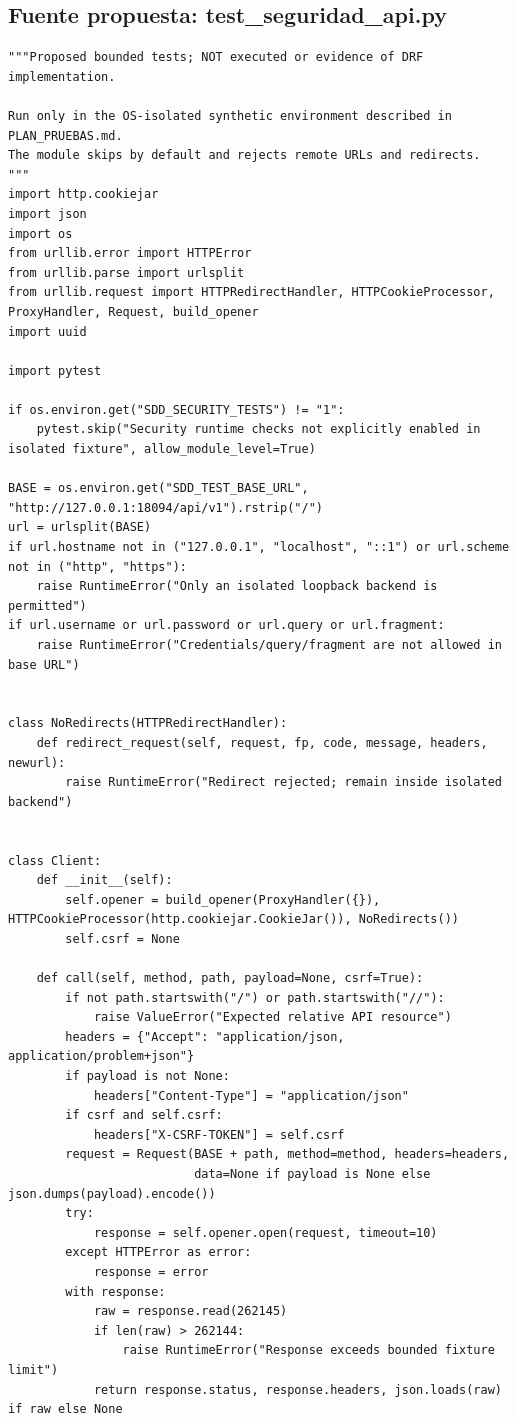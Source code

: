\documentclass[11pt,a4paper]{article}
\begin{document}
\subsection{Fuente propuesta: test\_seguridad\_api.py}
\begin{Verbatim}[breaklines=true,breakanywhere=true,fontsize=\footnotesize]
"""Proposed bounded tests; NOT executed or evidence of DRF implementation.

Run only in the OS-isolated synthetic environment described in PLAN_PRUEBAS.md.
The module skips by default and rejects remote URLs and redirects.
"""
import http.cookiejar
import json
import os
from urllib.error import HTTPError
from urllib.parse import urlsplit
from urllib.request import HTTPRedirectHandler, HTTPCookieProcessor, ProxyHandler, Request, build_opener
import uuid

import pytest

if os.environ.get("SDD_SECURITY_TESTS") != "1":
    pytest.skip("Security runtime checks not explicitly enabled in isolated fixture", allow_module_level=True)

BASE = os.environ.get("SDD_TEST_BASE_URL", "http://127.0.0.1:18094/api/v1").rstrip("/")
url = urlsplit(BASE)
if url.hostname not in ("127.0.0.1", "localhost", "::1") or url.scheme not in ("http", "https"):
    raise RuntimeError("Only an isolated loopback backend is permitted")
if url.username or url.password or url.query or url.fragment:
    raise RuntimeError("Credentials/query/fragment are not allowed in base URL")


class NoRedirects(HTTPRedirectHandler):
    def redirect_request(self, request, fp, code, message, headers, newurl):
        raise RuntimeError("Redirect rejected; remain inside isolated backend")


class Client:
    def __init__(self):
        self.opener = build_opener(ProxyHandler({}), HTTPCookieProcessor(http.cookiejar.CookieJar()), NoRedirects())
        self.csrf = None

    def call(self, method, path, payload=None, csrf=True):
        if not path.startswith("/") or path.startswith("//"):
            raise ValueError("Expected relative API resource")
        headers = {"Accept": "application/json, application/problem+json"}
        if payload is not None:
            headers["Content-Type"] = "application/json"
        if csrf and self.csrf:
            headers["X-CSRF-TOKEN"] = self.csrf
        request = Request(BASE + path, method=method, headers=headers,
                          data=None if payload is None else json.dumps(payload).encode())
        try:
            response = self.opener.open(request, timeout=10)
        except HTTPError as error:
            response = error
        with response:
            raw = response.read(262145)
            if len(raw) > 262144:
                raise RuntimeError("Response exceeds bounded fixture limit")
            return response.status, response.headers, json.loads(raw) if raw else None


\end{Verbatim}
\end{document}
